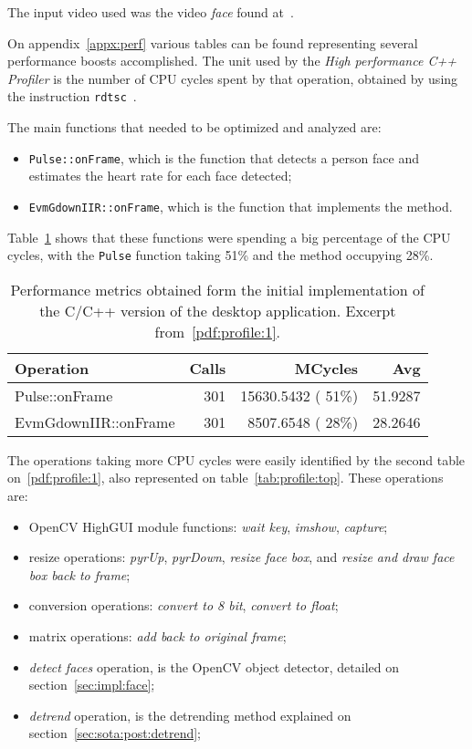 The input video used was the video \emph{face} found at~\cite{Wu2013Eulerian}.

On appendix~\ref{appx:perf} various tables can be found representing
several performance boosts accomplished. The unit used by the
\emph{High performance C++ Profiler} is the number of CPU cycles spent by
that operation, obtained by using the instruction
\texttt{rdtsc}~\cite{Andrew2013High}.

The main functions that needed to be optimized and analyzed are:

\begin{itemize}
  \item \texttt{Pulse::onFrame}, which is the function that detects a
        person face and estimates the heart rate for each face detected;
  \item \texttt{EvmGdownIIR::onFrame}, which is the function that
        implements the \evm{} method.
\end{itemize}

Table~\ref{tab:profile:initial} shows that these functions were spending
a big percentage of the CPU cycles, with the \texttt{Pulse} function
taking 51\% and the \evm{} method occupying 28\%.

\begin{table}[t]
  \centering
  \begin{tabular}{lrrr}
    \hline
    Operation & Calls & MCycles & Avg \\
    \hline
    Pulse::onFrame        & 301 & 15630.5432 ( 51\%) & 51.9287 \\
    EvmGdownIIR::onFrame  & 301 &  8507.6548 ( 28\%) & 28.2646 \\
    \hline
  \end{tabular}
  \caption{
    Performance metrics obtained form the initial implementation of the C/C++
    version of the desktop application. Excerpt from~\ref{pdf:profile:1}.
  }
  \label{tab:profile:initial}
\end{table}

The operations taking more CPU cycles were easily identified by the
second table on~\ref{pdf:profile:1}, also represented on
table~\ref{tab:profile:top}. These operations are:

\begin{itemize}
  \item OpenCV HighGUI module functions: \emph{wait key}, \emph{imshow},
        \emph{capture};
  \item resize operations: \emph{pyrUp}, \emph{pyrDown}, \emph{resize face box},
        and \emph{resize and draw face box back to frame};
  \item conversion operations: \emph{convert to 8 bit}, \emph{convert to float};
  \item matrix operations: \emph{add back to original frame};
  \item \emph{detect faces} operation, is the OpenCV object detector, detailed
        on section~\ref{sec:impl:face};
  \item \emph{detrend} operation, is the detrending method explained on
        section~\ref{sec:sota:post:detrend};
\end{itemize}

